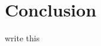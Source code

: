 \documentclass[11pt,letterpaper]{article}
\begin{document}

\section{Conclusion} %
write this



{}

\end{document}
